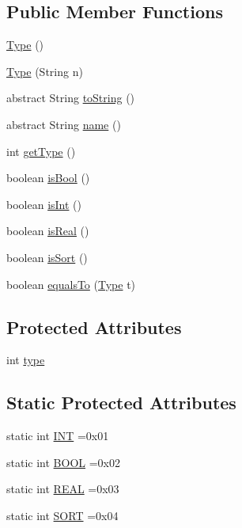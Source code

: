 \subsection*{Public Member Functions}
\begin{DoxyCompactItemize}
\item 
\hyperlink{classuran_1_1formula_1_1type_1_1_type_a81d82c0c231d499cfb3578dba88805cd}{Type} ()
\item 
\hyperlink{classuran_1_1formula_1_1type_1_1_type_a85d44a0427bb3be44cc40a34d0a05e8e}{Type} (String n)
\item 
abstract String \hyperlink{classuran_1_1formula_1_1type_1_1_type_a17bba0893e924f5c89b713fa367ab458}{to\+String} ()
\item 
abstract String \hyperlink{classuran_1_1formula_1_1type_1_1_type_acfe4a48755311202d8fd3951fb692923}{name} ()
\item 
int \hyperlink{classuran_1_1formula_1_1type_1_1_type_a08f85c0c456e46ed9dbf8b3eb63beb3d}{get\+Type} ()
\item 
boolean \hyperlink{classuran_1_1formula_1_1type_1_1_type_a92c88e608b7c3aa76d0d61456080f13c}{is\+Bool} ()
\item 
boolean \hyperlink{classuran_1_1formula_1_1type_1_1_type_a20ee7c3edf1723d463c7caff7e07f8dc}{is\+Int} ()
\item 
boolean \hyperlink{classuran_1_1formula_1_1type_1_1_type_ac9d2ab0e3f439a6c1532a6d27f002bca}{is\+Real} ()
\item 
boolean \hyperlink{classuran_1_1formula_1_1type_1_1_type_a5bd38a9357195f427c2e41524ed965e2}{is\+Sort} ()
\item 
boolean \hyperlink{classuran_1_1formula_1_1type_1_1_type_a159b8b78d86ae0d3f2ffbe7818ec8f64}{equals\+To} (\hyperlink{classuran_1_1formula_1_1type_1_1_type}{Type} t)
\end{DoxyCompactItemize}
\subsection*{Protected Attributes}
\begin{DoxyCompactItemize}
\item 
int \hyperlink{classuran_1_1formula_1_1type_1_1_type_a94d6f5842ebc886ea16f96232a003b1c}{type}
\end{DoxyCompactItemize}
\subsection*{Static Protected Attributes}
\begin{DoxyCompactItemize}
\item 
static int \hyperlink{classuran_1_1formula_1_1type_1_1_type_a7df72a3f18bfec61795bc30ea645cf16}{I\+N\+T} =0x01
\item 
static int \hyperlink{classuran_1_1formula_1_1type_1_1_type_a78e11f2d5bad456fc1ead5a24f71a988}{B\+O\+O\+L} =0x02
\item 
static int \hyperlink{classuran_1_1formula_1_1type_1_1_type_ac7ad443ffa0eebe8ce0191884c90b739}{R\+E\+A\+L} =0x03
\item 
static int \hyperlink{classuran_1_1formula_1_1type_1_1_type_a5e12f7d3ee8c14a0f67d3a573622ada6}{S\+O\+R\+T} =0x04
\end{DoxyCompactItemize}


